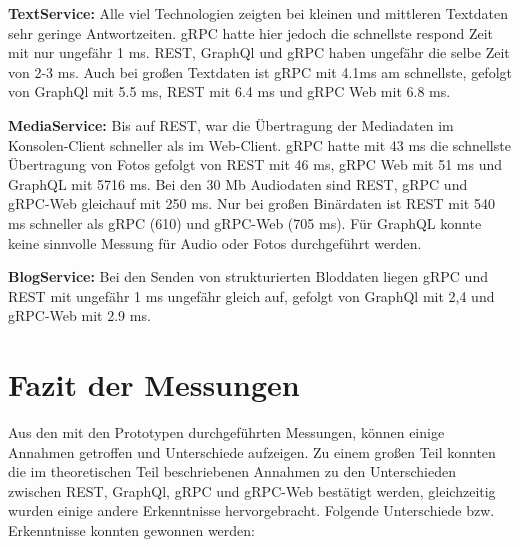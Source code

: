 \clearpage
\textbf{TextService:}  
Alle viel Technologien zeigten bei kleinen und mittleren Textdaten sehr geringe Antwortzeiten. gRPC hatte hier jedoch die schnellste respond Zeit mit nur ungefähr 1 ms. REST, GraphQl und gRPC haben ungefähr die selbe Zeit von 2-3 ms.
Auch bei großen Textdaten ist gRPC mit 4.1ms am schnellste, gefolgt von GraphQl mit 5.5 ms, REST mit 6.4 ms und gRPC Web mit 6.8 ms.


\textbf{MediaService:}  
Bis auf REST, war die Übertragung der Mediadaten im Konsolen-Client schneller als im Web-Client. gRPC hatte mit 43 ms die schnellste Übertragung von Fotos gefolgt von REST mit 46 ms, gRPC Web mit 51 ms und GraphQL mit 5716 ms. Bei den 30 Mb Audiodaten sind REST, gRPC und gRPC-Web gleichauf mit 250 ms. Nur bei großen Binärdaten ist REST mit 540 ms schneller als gRPC (610) und gRPC-Web (705 ms). Für GraphQL konnte keine sinnvolle Messung für Audio oder Fotos durchgeführt werden.

\textbf{BlogService:}  
Bei den Senden von strukturierten Bloddaten liegen gRPC und REST mit ungefähr 1 ms ungefähr gleich auf, gefolgt von GraphQl mit 2,4 und gRPC-Web mit 2.9 ms.

\clearpage
\section*{Fazit der Messungen}
Aus den mit den Prototypen durchgeführten Messungen, können einige Annahmen getroffen und Unterschiede aufzeigen. Zu einem großen Teil konnten die im theoretischen Teil beschriebenen Annahmen zu den Unterschieden zwischen REST, GraphQl, gRPC und gRPC-Web bestätigt werden, gleichzeitig wurden einige andere Erkenntnisse hervorgebracht. Folgende Unterschiede bzw. Erkenntnisse konnten gewonnen werden:

\chapterend
